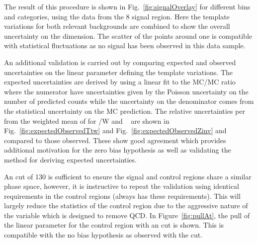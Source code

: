 The result of this procedure is shown in Fig.~\ref{fig:signalOverlay} for different 
\scalht bins and categories, using the data from the 8 \TeV signal region. 
Here the template variations for both relevant backgrounds are combined to show 
the overall uncertainty on the \mht dimension. The scatter of the points around 
one is compatible with statistical fluctuations
as no signal has been observed in this data sample.

An additional validation is carried out by comparing expected and observed uncertainties
on the linear parameter defining the template variations.
The expected uncertainties are derived by using a linear fit to the MC/MC ratio where the numerator
have uncertainties given by the Poisson uncertainty on the number of predicted counts while
the uncertainty on the denominator comes from the statistical uncertainty on the
MC prediction. The relative uncertainties per \GeV from the weighted mean of \mht
for \ttbar/W and \zInv~ are shown in Fig.~\ref{fig:expectedObservedTtw} 
and Fig.~\ref{fig:expectedObservedZinv} and compared to those observed.
These show good agreement which provides additional motivation for the 
zero bias hypothesis as well as validating the method for deriving expected uncertainties.

An \mht cut of 130 \GeV is sufficient to ensure the 
signal and control regions share a similar phase space, however,
it is instructive to repeat the validation using identical \alt 
requirements in the control regions (\gj always has these requirements).
This will largely reduce the statistics of the control 
region due to the aggressive nature of the \alt variable which is designed to remove QCD. 
In Figure~\ref{fig:pullAt}, the pull of the linear parameter for the \mj control region
with an \alt cut is shown. This is compatible with the no bias hypothesis as
observed with the \mht cut.


